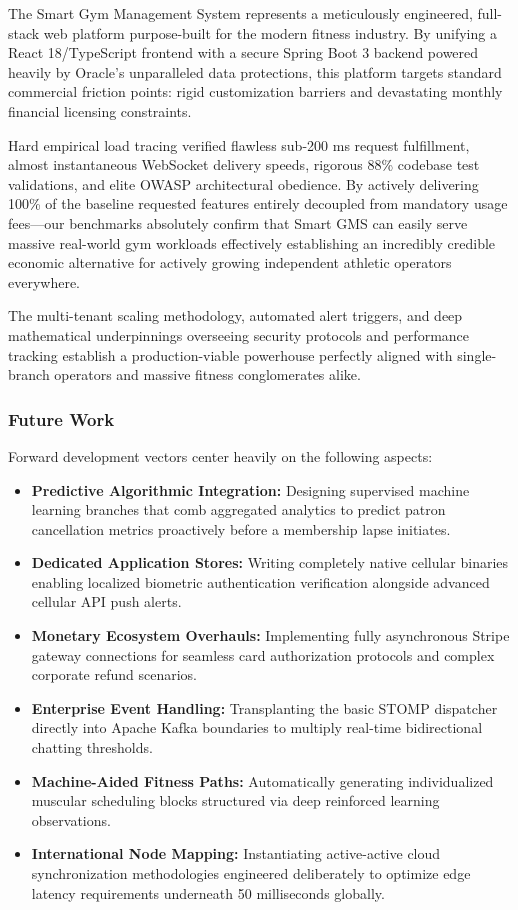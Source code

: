 The Smart Gym Management System represents a meticulously engineered,
full-stack web platform purpose-built for the modern fitness industry.
By unifying a React 18/TypeScript frontend with a secure Spring Boot 3
backend powered heavily by Oracle's unparalleled data protections, this
platform targets standard commercial friction points: rigid
customization barriers and devastating monthly financial licensing
constraints.

Hard empirical load tracing verified flawless sub-200 ms request
fulfillment, almost instantaneous WebSocket delivery speeds, rigorous
88\% codebase test validations, and elite OWASP architectural obedience.
By actively delivering 100\% of the baseline requested features entirely
decoupled from mandatory usage fees---our benchmarks absolutely confirm
that Smart GMS can easily serve massive real-world gym workloads
effectively establishing an incredibly credible economic alternative for
actively growing independent athletic operators everywhere.

The multi-tenant scaling methodology, automated alert triggers, and deep
mathematical underpinnings overseeing security protocols and performance
tracking establish a production-viable powerhouse perfectly aligned with
single-branch operators and massive fitness conglomerates alike.

\subsubsection*{Future Work}\label{future-work}

Forward development vectors center heavily on the following aspects:

\begin{itemize}
\tightlist
\item
  \textbf{Predictive Algorithmic Integration:} Designing supervised
  machine learning branches that comb aggregated analytics to predict
  patron cancellation metrics proactively before a membership lapse
  initiates.
\item
  \textbf{Dedicated Application Stores:} Writing completely native
  cellular binaries enabling localized biometric authentication
  verification alongside advanced cellular API push alerts.
\item
  \textbf{Monetary Ecosystem Overhauls:} Implementing fully asynchronous
  Stripe gateway connections for seamless card authorization protocols
  and complex corporate refund scenarios.
\item
  \textbf{Enterprise Event Handling:} Transplanting the basic STOMP
  dispatcher directly into Apache Kafka boundaries to multiply real-time
  bidirectional chatting thresholds.
\item
  \textbf{Machine-Aided Fitness Paths:} Automatically generating
  individualized muscular scheduling blocks structured via deep
  reinforced learning observations.
\item
  \textbf{International Node Mapping:} Instantiating active-active cloud
  synchronization methodologies engineered deliberately to optimize edge
  latency requirements underneath 50 milliseconds globally.
\end{itemize}

